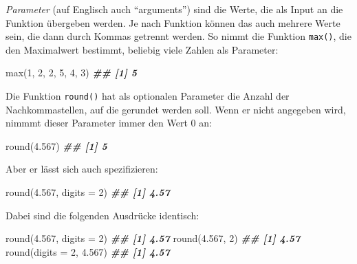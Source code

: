 \documentclass[11pt,german,a4paper]{article}
\newenvironment{Shaded}{\begin{snugshade}}{\end{snugshade}}
\newcommand{\AttributeTok}[1]{\textcolor[rgb]{0.77,0.63,0.00}{#1}}
\newcommand{\DecValTok}[1]{\textcolor[rgb]{0.00,0.00,0.81}{#1}}
\newcommand{\DocumentationTok}[1]{\textcolor[rgb]{0.56,0.35,0.01}{\textbf{\textit{#1}}}}
\newcommand{\FloatTok}[1]{\textcolor[rgb]{0.00,0.00,0.81}{#1}}
\newcommand{\FunctionTok}[1]{\textcolor[rgb]{0.00,0.00,0.00}{#1}}
\newcommand{\NormalTok}[1]{#1}
\begin{document}
\emph{Parameter} (auf Englisch auch ``arguments'') sind die Werte, die als Input an die Funktion übergeben werden. Je nach Funktion können das auch mehrere Werte sein, die dann durch Kommas getrennt werden. So nimmt die Funktion \texttt{max()}, die den Maximalwert bestimmt, beliebig viele Zahlen als Parameter:

\begin{Shaded}
\begin{Highlighting}[]
\FunctionTok{max}\NormalTok{(}\DecValTok{1}\NormalTok{, }\DecValTok{2}\NormalTok{, }\DecValTok{2}\NormalTok{, }\DecValTok{5}\NormalTok{, }\DecValTok{4}\NormalTok{, }\DecValTok{3}\NormalTok{)}
\DocumentationTok{\#\# [1] 5}
\end{Highlighting}
\end{Shaded}

Die Funktion \texttt{round()} hat als optionalen Parameter die Anzahl der Nachkommastellen, auf die gerundet werden soll. Wenn er nicht angegeben wird, nimmmt dieser Parameter immer den Wert 0 an:

\begin{Shaded}
\begin{Highlighting}[]
\FunctionTok{round}\NormalTok{(}\FloatTok{4.567}\NormalTok{)}
\DocumentationTok{\#\# [1] 5}
\end{Highlighting}
\end{Shaded}

Aber er lässt sich auch spezifizieren:

\begin{Shaded}
\begin{Highlighting}[]
\FunctionTok{round}\NormalTok{(}\FloatTok{4.567}\NormalTok{, }\AttributeTok{digits =} \DecValTok{2}\NormalTok{)}
\DocumentationTok{\#\# [1] 4.57}
\end{Highlighting}
\end{Shaded}

Dabei sind die folgenden Ausdrücke identisch:

\begin{Shaded}
\begin{Highlighting}[]
\FunctionTok{round}\NormalTok{(}\FloatTok{4.567}\NormalTok{, }\AttributeTok{digits =} \DecValTok{2}\NormalTok{)}
\DocumentationTok{\#\# [1] 4.57}
\FunctionTok{round}\NormalTok{(}\FloatTok{4.567}\NormalTok{, }\DecValTok{2}\NormalTok{)}
\DocumentationTok{\#\# [1] 4.57}
\FunctionTok{round}\NormalTok{(}\AttributeTok{digits =} \DecValTok{2}\NormalTok{, }\FloatTok{4.567}\NormalTok{)}
\DocumentationTok{\#\# [1] 4.57}
\end{Highlighting}
\end{Shaded}
\end{document}
